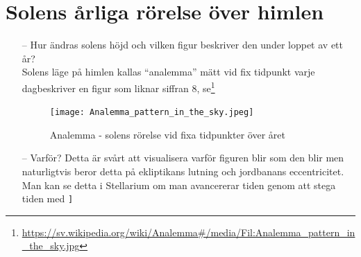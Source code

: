 \documentclass[./exercises.tex]{subfiles}
\begin{document}
\section{Solens årliga rörelse över himlen}
\begin{itemize}
\item[--] Hur ändras solens höjd och vilken figur beskriver den under loppet av ett år?\\

Solens läge på himlen kallas ``analemma'' mätt vid fix tidpunkt varje dagbeskriver en figur som liknar siffran 8, 
se\footnote{\url{https://sv.wikipedia.org/wiki/Analemma\#/media/Fil:Analemma_pattern_in_the_sky.jpg}}
\begin{figure}[H]
\centering
  \texttt{[image: Analemma\_pattern\_in\_the\_sky.jpeg]}
  \caption{Analemma - solens rörelse vid fixa tidpunkter över året}
  \label{fig4}
\end{figure}
 
\item[--]Varför? Detta är svårt att visualisera varför figuren blir som den blir men
naturligtvis beror detta på ekliptikans lutning och jordbanans eccentricitet.
Man kan se detta i Stellarium om man avancererar tiden genom att stega tiden med \verb+]+
\end{itemize}
\newpage
\end{document}

